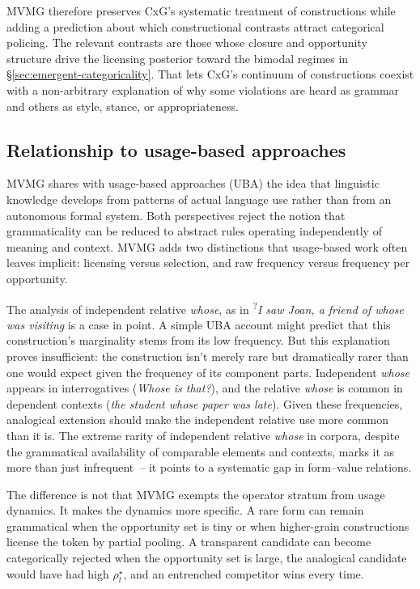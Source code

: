 \documentclass[12pt,letterpaper]{article}
\newcommand{\mention}[1]{\textit{#1}}
\begin{document}
MVMG therefore preserves CxG's systematic treatment of constructions while adding a prediction about which constructional contrasts attract categorical policing. The relevant contrasts are those whose closure and opportunity structure drive the licensing posterior toward the bimodal regimes in \S\ref{sec:emergent-categoricality}. That lets CxG's continuum of constructions coexist with a non-arbitrary explanation of why some violations are heard as grammar and others as style, stance, or appropriateness.

\subsection{Relationship to usage-based approaches}

MVMG shares with usage-based approaches (UBA) \autocite{bybee2006, bybee2007frequency, bybee2010} the idea that linguistic knowledge develops from patterns of actual language use rather than from an autonomous formal system. Both perspectives reject the notion that grammaticality can be reduced to abstract rules operating independently of meaning and context. MVMG adds two distinctions that usage-based work often leaves implicit: licensing versus selection, and raw frequency versus frequency per opportunity.

The analysis of independent relative \mention{whose}, as in \textsuperscript{?}\textit{I saw Joan, a friend of whose was visiting} is a case in point. A simple UBA account might predict that this construction's marginality stems from its low frequency. But this explanation proves insufficient: the construction isn't merely rare but dramatically rarer than one would expect given the frequency of its component parts. Independent \mention{whose} appears in interrogatives (\mention{Whose is that?}), and the relative \mention{whose} is common in dependent contexts (\mention{the student whose paper was late}). Given these frequencies, analogical extension should make the independent relative use more common than it is. The extreme rarity of independent relative \mention{whose} in corpora, despite the grammatical availability of comparable elements and contexts, marks it as more than just infrequent~-- it points to a systematic gap in form--value relations.

The difference is not that MVMG exempts the operator stratum from usage dynamics. It makes the dynamics more specific. A rare form can remain grammatical when the opportunity set is tiny or when higher-grain constructions license the token by partial pooling. A transparent candidate can become categorically rejected when the opportunity set is large, the analogical candidate would have had high $\rho_t^\star$, and an entrenched competitor wins every time.
\end{document}
